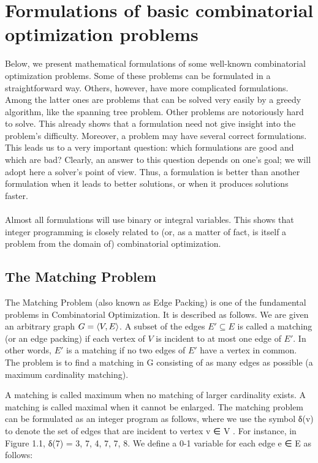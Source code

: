 \documentclass[titlepage]{book}
\begin{document}
\section{Formulations of basic combinatorial optimization problems}
Below, we present mathematical formulations of some well-known combinatorial optimization problems. Some of these problems can be formulated in a straightforward way. Others, however, have more complicated formulations. Among the latter ones are problems that can be solved very easily by a greedy algorithm, like the spanning tree problem. Other problems are notoriously hard to solve. This already shows that a formulation need not give insight into the problem's difficulty. Moreover, a problem may have several correct formulations. This leads us to a very important question: which formulations are good and which are bad? Clearly, an answer to this question depends on one's goal; we will adopt here a solver's point of view. Thus, a formulation is better than another formulation when it leads to better solutions, or when it produces solutions faster.

\paragraph{}
Almost all formulations will use binary or integral variables. This shows that integer programming is closely related to (or, as a matter of fact, is itself a problem from the domain of) combinatorial optimization.

\subsection{The Matching Problem}
The Matching Problem (also known as Edge Packing) is one of the fundamental problems in Combinatorial Optimization. It is described as follows. We are given an arbitrary graph $G=\left\langle V,E \right\rangle$. A subset of the edges $E'\subseteq E$ is called a matching (or an edge packing) if each vertex of $V$ is incident to at most one edge of $E'$. In other words, $E'$ is a matching if no two edges of $E'$ have a vertex in common. The problem is to find a matching in G consisting of as many edges as possible (a maximum cardinality matching).


A matching is called maximum when no matching of larger cardinality exists. A matching is called
maximal when it cannot be enlarged.
The matching problem can be formulated as an integer program as follows, where we use the symbol
δ(v) to denote the set of edges that are incident to vertex v ∈ V . For instance, in Figure 1.1, δ(7) =
{{3, 7}, {4, 7}, {7, 8}}. We define a 0-1 variable for each edge e ∈ E as follows:
\end{document}
